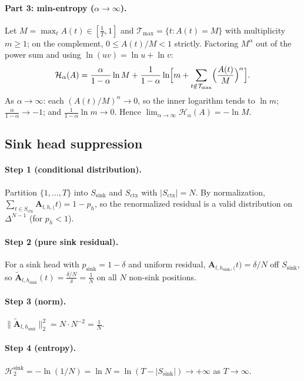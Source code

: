 \documentclass[final,5p,times,twocolumn]{elsarticle}
\theoremstyle{definition}
\theoremstyle{remark}
\newcommand{\Attn}[2]{\mathbf{A}_{#1,#2}}
\newcommand{\Renyi}[2]{\mathcal{H}_{#1}\!\left(#2\right)}
\newcommand{\Ssink}{S_{\mathrm{sink}}}
\newcommand{\Hsink}{\mathcal{H}^{\mathrm{sink}}_{2}}
\begin{document}
\paragraph{Part 3: min-entropy ($\alpha \to \infty$).}
Let $M = \max_t A(t) \in [\frac1T, 1]$ and
 $\mathcal{T}_{\max} = \{t : A(t) = M\}$ with multiplicity
 $m \ge 1$; on the complement, $0 \le A(t)/M < 1$ strictly. Factoring
 $M^{\alpha}$ out of the power sum and using $\ln(uv) = \ln u + \ln v$:
\[
  \Renyi{\alpha}{A}
  = \frac{\alpha}{1-\alpha}\ln M
  + \frac{1}{1-\alpha}\ln\Bigl[m
      + \sum_{t\notin\mathcal{T}_{\max}}
        \Bigl(\frac{A(t)}{M}\Bigr)^{\alpha}\Bigr].
\]
As $\alpha \to \infty$: each $(A(t)/M)^{\alpha} \to 0$, so the inner
logarithm tends to $\ln m$; $\frac{\alpha}{1-\alpha} \to -1$; and
 $\frac{1}{1-\alpha}\ln m \to 0$. Hence
 $\lim_{\alpha\to\infty}\Renyi{\alpha}{A} = -\ln M$.

\subsection{Sink head suppression}
\label{app:sink}

\paragraph{Step 1 (conditional distribution).}
Partition $\{1,\dots,T\}$ into $\Ssink$ and
 $S_{\mathrm{ctx}}$ with $|S_{\mathrm{ctx}}| = N$. By normalization,
 $\sum_{t\in S_{\mathrm{ctx}}}\Attn{l,h}(t) = 1 - p_h$, so the
renormalized residual is a valid distribution on $\Delta^{N-1}$ (for
 $p_h < 1$).

\paragraph{Step 2 (pure sink residual).}
For a sink head with $p_{\mathrm{sink}} = 1-\delta$ and uniform
residual, $\Attn{l,h_{\mathrm{sink}}}(t) = \delta/N$ off $\Ssink$, so
 $\tilde{\mathbf{A}}_{l,h_{\mathrm{sink}}}(t) = \frac{\delta/N}{\delta}
= \frac1N$ on all $N$ non-sink positions.

\paragraph{Step 3 (norm).}
 $\|\tilde{\mathbf{A}}_{l,h_{\mathrm{sink}}}\|_2^2 = N \cdot N^{-2} =
\frac1N$.

\paragraph{Step 4 (entropy).}
 $\Hsink = -\ln(1/N) = \ln N = \ln(T - |\Ssink|) \to +\infty$ as
 $T \to \infty$.
\end{document}

